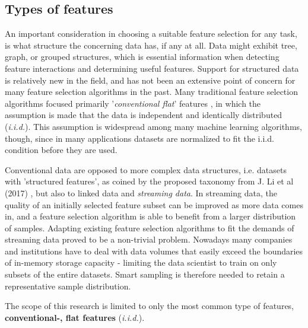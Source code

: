 \documentclass{article}
\begin{document}
\subsection{Types of features}
An important consideration in choosing a suitable feature selection for any task, is what structure the concerning data has, if any at all. Data might exhibit tree, graph, or grouped structures, which is essential information when detecting feature interactions and determining useful features. Support for structured data is relatively new in the field, and has not been an extensive point of concern for many feature selection algorithms in the past. Many traditional feature selection algorithms focused primarily '\textit{conventional flat}' features \citep{li2017feature}, in which the assumption is made that the data is independent and identically distributed (\textit{i.i.d.}). This assumption is widespread among many machine learning algorithms, though, since in many applications datasets are normalized to fit the i.i.d. condition before they are used.

Conventional data are opposed to more complex data structures, i.e. datasets with 'structured features', as coined by the proposed taxonomy from J. Li et al (2017) \cite{li2017feature}, but also to linked data and \textit{streaming data}. In streaming data, the quality of an initially selected feature subset can be improved as more data comes in, and a feature selection algorithm is able to benefit from a larger distribution of samples. Adapting existing feature selection algorithms to fit the demands of streaming data proved to be a non-trivial problem. Nowadays many companies and institutions have to deal with data volumes that easily exceed the boundaries of in-memory storage capacity - limiting the data scientist to train on only subsets of the entire datasets. Smart sampling is therefore needed to retain a representative sample distribution.

The scope of this research is limited to only the most common type of features, \textbf{conventional-, flat features} (\textit{i.i.d.}).


\end{document}
